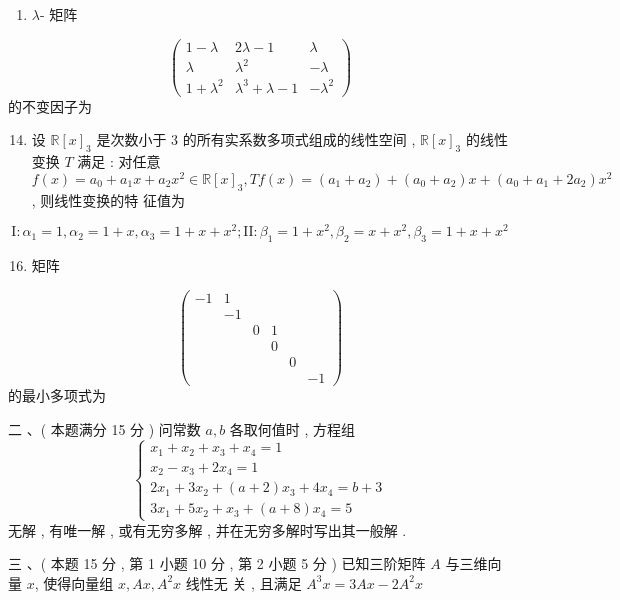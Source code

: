 \documentclass[10pt]{article}
\begin{document}
{\begin{enumerate}
  \item $\lambda$- 矩阵 

\end{enumerate}
$$
\left(\begin{array}{ccc}
1-\lambda & 2 \lambda-1 & \lambda \\
\lambda & \lambda^{2} & -\lambda \\
1+\lambda^{2} & \lambda^{3}+\lambda-1 & -\lambda^{2}
\end{array}\right)
$$
 的不变因子为 

\begin{enumerate}
  \setcounter{enumi}{13}
  \item  设  $\mathbb{R}[x]_{3}$  是次数小于  3  的所有实系数多项式组成的线性空间 , $\mathbb{R}[x]_{3}$  的线性变换  $T$  满足 :  对任意  $f(x)=a_{0}+a_{1} x+a_{2} x^{2} \in \mathbb{R}[x]_{3}, T f(x)=\left(a_{1}+a_{2}\right)+\left(a_{0}+a_{2}\right) x+\left(a_{0}+a_{1}+2 a_{2}\right) x^{2}$,  则线性变换的特   征值为 
\end{enumerate}
$$
\mathrm{I}: \alpha_{1}=1, \alpha_{2}=1+x, \alpha_{3}=1+x+x^{2} ; \mathrm{II}: \beta_{1}=1+x^{2}, \beta_{2}=x+x^{2}, \beta_{3}=1+x+x^{2}
$$

\begin{enumerate}
  \setcounter{enumi}{15}
  \item  矩阵 
\end{enumerate}
$$
\left(\begin{array}{cccccc}
-1 & 1 & & & & \\
& -1 & & & & \\
& & 0 & 1 & & \\
& & & 0 & & \\
& & & & 0 & \\
& & & & & -1
\end{array}\right)
$$
 的最小多项式为 

 二 、( 本题满分  15  分 )  问常数  $a, b$  各取何值时 ,  方程组 
$$
\left\{\begin{array}{l}
x_{1}+x_{2}+x_{3}+x_{4}=1 \\
x_{2}-x_{3}+2 x_{4}=1 \\
2 x_{1}+3 x_{2}+(a+2) x_{3}+4 x_{4}=b+3 \\
3 x_{1}+5 x_{2}+x_{3}+(a+8) x_{4}=5
\end{array}\right.
$$
 无解 ,  有唯一解 ,  或有无穷多解 ,  并在无穷多解时写出其一般解 .

 三 、( 本题  15  分 ,  第  1  小题  10  分 ,  第  2  小题  5  分 )  已知三阶矩阵  $A$  与三维向量  $x$,  使得向量组  $x, A x, A^{2} x$  线性无   关 ,  且满足  $A^{3} x=3 A x-2 A^{2} x$

}
\end{document}

